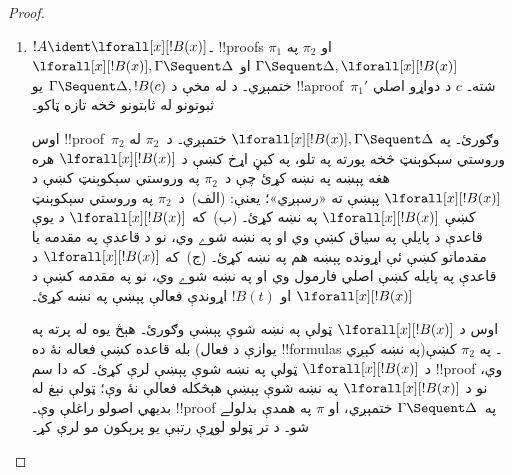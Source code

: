 \documentclass[../../../include/open-logic-section]{subfiles}
\begin{document}
\begin{proof}
\begin{enumerate}
\[
  \AxiomC{}
  \RightLabel{$\pi_2'$}
  \Deduce$\Gamma \fCenter \Delta, !B$
  \AxiomC{}
  \RightLabel{$\pi_1'$}
  \Deduce$!B, \Gamma \fCenter \Delta, !C$
  \AxiomC{}
  \RightLabel{$\pi_2'''$}
  \Deduce$!C, !B, \Gamma \fCenter \Delta$
  \RightLabel{\CutCS}
  \BinaryInf$!B, \Gamma \fCenter \Delta$
  \RightLabel{\CutCS}
  \BinaryInf$\Gamma \fCenter \Delta$
  \DisplayProof
  \]
  \item $!A \ident \lforall[x][!B(x)]$۔ !!{proof}s $\pi_1$ او $\pi_2$ په $\Gamma \Sequent \Delta, \lforall[x][!B(x)]$ او $\lforall[x][!B(x)], \Gamma \Sequent \Delta$ ختمېږي۔ د  له مخې د $\Gamma \Sequent \Delta, !B(c)$ يو !!a{proof}~$\pi_1'$ شته۔ $c$ د دواړو اصلي ثبوتونو له ثابتونو څخه تازه ټاکو۔

اوس !!{proof}~$\pi_2$ وګورئ۔ په $\lforall[x][!B(x)], \Gamma \Sequent \Delta$ ختمېږي۔ د~$\pi_2$ له وروستي سېکوېنټ څخه پورته په تلو، په کيڼ اړخ کښې د $\lforall[x][!B(x)]$ هره هغه پېښه په نښه کړئ چې د~$\pi_2$ په وروستي سېکوېنټ کښې د $\lforall[x][!B(x)]$ پېښې ته «رسېږي»؛ يعنې:
(الف)~د~$\pi_2$ په وروستي سېکوېنټ کښې $\lforall[x][!B(x)]$ په نښه کړئ۔ (ب)~که $\lforall[x][!B(x)]$ د يوې قاعدې د پايلې په سياق کښې وي او په نښه شوے وي، نو د قاعدې په مقدمه يا مقدماتو کښې ئې اړونده پېښه هم په نښه کړئ۔ (ج)~که $\lforall[x][!B(x)]$ د \LeftR{\lforall} قاعدې په پايله کښې اصلي فارمول وي او په نښه شوے وي، نو په مقدمه کښې د $\lforall[x][!B(x)]$ او $!B(t)$ اړوندې فعالې پېښې په نښه کړئ۔

اوس د $\lforall[x][!B(x)]$ ټولې په نښه شوې پېښې وګورئ۔ هېڅ يوه له \LeftR{\lforall} پرته په بله قاعده کښې فعاله نۀ ده (يوازې د \LeftR{\lforall} فعال !!{formula}s په نښه کېږي)۔ په $\pi_2$ کښې د $\lforall[x][!B(x)]$ ټولې په نښه شوې پېښې لرې کړئ۔ که دا سم !!{proof} وي، نو د $\lforall[x][!B(x)]$ په نښه شوې پېښې هېڅکله فعالې نۀ وې؛ ټولې نېغ له بديهي اصولو راغلې وې۔ !!{proof} په~$\Gamma \Sequent \Delta$ ختمېږي، او $\pi$ په همدې بدلولے شو۔ د تر ټولو لوړې رتبې يو پرېکون مو لرې کړ۔


\end{enumerate}
\end{proof}
\end{document}
